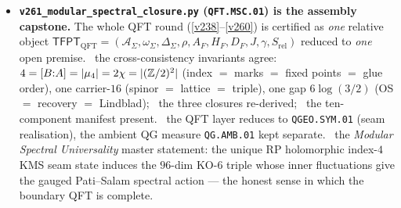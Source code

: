 \begin{itemize}
  $E_8$ Cartan is even/$\det1$/positive-definite; \mE\ $H^2(\mathrm{K3},\Z)=U^3\oplus E_8({-}1)^2$ (rank $22$,
  $\det{-}1$, even, signature $(3,19)$); \mE\ the seam is $T^2/(z{\mapsto}{-}z)$ with $4$ marks (orbifold
  Euler char $0$); \mE\ the carrier-$16$ are the $|A[2]|{=}2^4{=}16$ Kummer nodes $=\dim S^+$ (\vref{v197}),
  $16{=}4{\times}4$; \mE\ honest note --- the rank-$16$ Kummer lattice is \emph{not} the $E_8({-}1)^2$
  summand. \mC\ so the \vref{v1} ``glue $D_5{\oplus}A_3{+}\mu_4{\Rightarrow}E_8$'' is the lattice shadow of a
  single object; $E_8$ appears both locally (du Val $\mathbb C^2/2I$, \vref{v232}/\vref{v236}) and globally
  ($H^2$ summand). A unification, not a closure.
\item \textbf{\texttt{v261\_modular\_spectral\_closure.py} (\texttt{QFT.MSC.01}) is the assembly capstone.}
  The whole QFT round (\vref{v238}--\vref{v260}) is certified as \emph{one} relative object
  $\mathsf{TFPT}_{\mathrm{QFT}}=(\mathcal A_\Sigma,\omega_\Sigma,\Delta_\Sigma,\rho,A_F,H_F,D_F,J,\gamma,
  S_{\mathrm{rel}})$ reduced to \emph{one} open premise. \mE\ the cross-consistency invariants agree:
  $4=[B{:}A]=|\mu_4|=2\chi=|(\mathbb{Z}/2)^2|$ (index $=$ marks $=$ fixed points $=$ glue order), one carrier-$16$
  (spinor $=$ lattice $=$ triple), one gap $6\log(3/2)$ (OS $=$ recovery $=$ Lindblad); \mE\ the three
  closures re-derived; \mE\ the ten-component manifest present. \mO\ the QFT layer reduces to
  \texttt{QGEO.SYM.01} (seam realisation), the ambient QG measure \texttt{QG.AMB.01} kept separate. \mC\
  the \emph{Modular Spectral Universality} master statement: the unique RP holomorphic index-$4$ KMS seam
  state induces the $96$-dim KO-$6$ triple whose inner fluctuations give the gauged Pati--Salam spectral
  action --- the honest sense in which the boundary QFT is complete.
\end{itemize}

